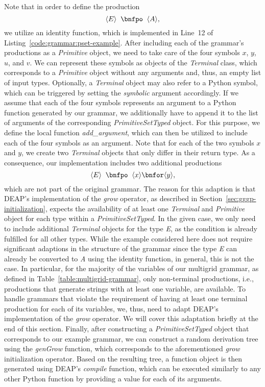 Note that in order to define the production
\begin{equation*}
	\ps E \; \; \bnfpo \; \; \ps A,
\end{equation*}
we utilize an identity function, which is implemented in Line~12 of Listing~\ref{code:grammar:pset-example}.
After including each of the grammar's productions as a \emph{Primitive} object, we need to take care of the four symbols $x$, $y$, $u$, and $v$.
We can represent these symbols as objects of the \emph{Terminal} class, which corresponds to a \emph{Primitive} object without any arguments and, thus, an empty list of input types.
Optionally, a \emph{Terminal} object may also refer to a Python symbol, which can be triggered by setting the \emph{symbolic} argument accordingly.
If we assume that each of the four symbols represents an argument to a Python function generated by our grammar, we additionally have to append it to the list of arguments of the corresponding \emph{PrimitiveSetTyped} object.
For this purpose, we define the local function \emph{add\_argument}, which can then be utilized to include each of the four symbols as an argument. 
Note that for each of the two symbols $x$ and $y$, we create two \emph{Terminal} objects that only differ in their return type.
As a consequence, our implementation includes two additional productions
\begin{equation*}
	\ps E \; \; \bnfpo \; \; \ps x \bnfor \ps y,
\end{equation*}
which are not part of the original grammar.
The reason for this adaption is that DEAP's implementation of the \emph{grow} operator, as described in Section~\ref{sec:gggp-initialization}, expects the availability of at least one \emph{Terminal} and \emph{Primitive} object for each type within a \emph{PrimitiveSetTyped}.
In the given case, we only need to include additional \emph{Terminal} objects for the type \emph{E}, as the condition is already fulfilled for all other types.
While the example considered here does not require significant adaptions in the structure of the grammar since the type \emph{E} can already be converted to \emph{A} using the identity function, in general, this is not the case.
In particular, for the majority of the variables of our multigrid grammar, as defined in Table~\ref{table:multigrid-grammar}, only non-terminal productions, i.e., productions that generate strings with at least one variable, are available.
To handle grammars that violate the requirement of having at least one terminal production for each of its variables, we, thus, need to adapt DEAP's implementation of the \emph{grow} operator.
We will cover this adaptation briefly at the end of this section.
Finally, after constructing a \emph{PrimitiveSetTyped} object that corresponds to our example grammar, we can construct a random derivation tree using the \emph{genGrow} function, which corresponds to the aforementioned \emph{grow} initialization operator.
Based on the resulting tree, a function object is then generated using DEAP's \emph{compile} function, which can be executed similarly to any other Python function by providing a value for each of its arguments.

